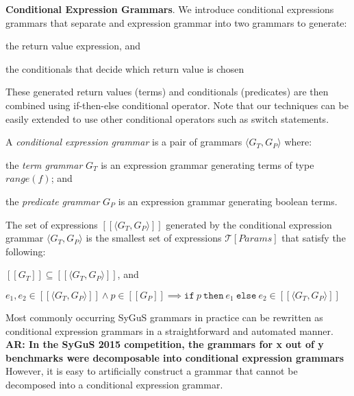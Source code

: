\documentclass{llncs}
\newcommand\arsays[1]{{\bf AR: #1}}
\newcommand\tuple[1]{\langle #1 \rangle}
\newcommand\Expr{e}
\newcommand\Pred{p}
\newcommand\Grammar{G}
\newcommand\sem[1]{[\![ #1 ]\!]}
\newcommand\SynthFun{f}
\newcommand\range{\mathit{range}}
\newcommand\FormalParameters{\mathit{Params}}
\newcommand\Theory{\mathcal{T}}
\newcommand\ITE[3]{\mathtt{if}~#1~\mathtt{then}~#2~\mathtt{else}~#3}
\newcommand{\sygus}{{\sffamily\fontsize{8.5}{10}\selectfont
    SyGuS}\xspace}
\renewcommand{\paragraph}[1]{\par\noindent\textbf{#1}.}
\begin{document}
\paragraph{Conditional Expression Grammars}
We introduce conditional expressions grammars that separate and
expression grammar into two grammars to generate:
\begin{inparaenum}[(a)]
\item the return value expression, and
\item the conditionals that decide which return value is chosen
\end{inparaenum}
These generated return values (terms) and conditionals (predicates) are
then combined using if-then-else conditional operator.
Note that our techniques can be easily extended to use other conditional
operators such as switch statements.

A {\em conditional expression grammar} is a pair of grammars $\tuple{
\Grammar_T, \Grammar_P }$ where:
\begin{inparaenum}[(a)]
\item the {\em term grammar} $\Grammar_T$ is an expression grammar
  generating terms of type $\range(\SynthFun)$; and
\item the {\em predicate grammar} $\Grammar_P$ is an expression
  grammar generating boolean terms.
\end{inparaenum}
The set of expressions $\sem{\tuple{ \Grammar_T, \Grammar_P }}$
generated by the conditional expression grammar $\tuple{ G_T, G_P }$ is
the smallest set of expressions $\Theory[\FormalParameters]$ that
satisfy the following:
\begin{inparaenum}[(a)]
\item $\sem{\Grammar_T} \subseteq \sem{\tuple{ \Grammar_T, \Grammar_P
  }}$, and
\item $\Expr_1, \Expr_2 \in \sem{\tuple{ \Grammar_T, \Grammar_P }}
  \wedge \Pred \in \sem{\Grammar_P} \implies
  \ITE{\Pred}{\Expr_1}{\Expr_2} \in \sem{\tuple{ \Grammar_T, \Grammar_P }}$
\end{inparaenum}

Most commonly occurring SyGuS grammars in practice can be rewritten
as conditional expression grammars in a straightforward and automated
manner.
\arsays{In the \sygus 2015 competition, the grammars for x out of y
benchmarks were decomposable into conditional expression grammars}
However, it is easy to artificially construct a grammar that cannot be
decomposed into a conditional expression grammar.
\end{document}
